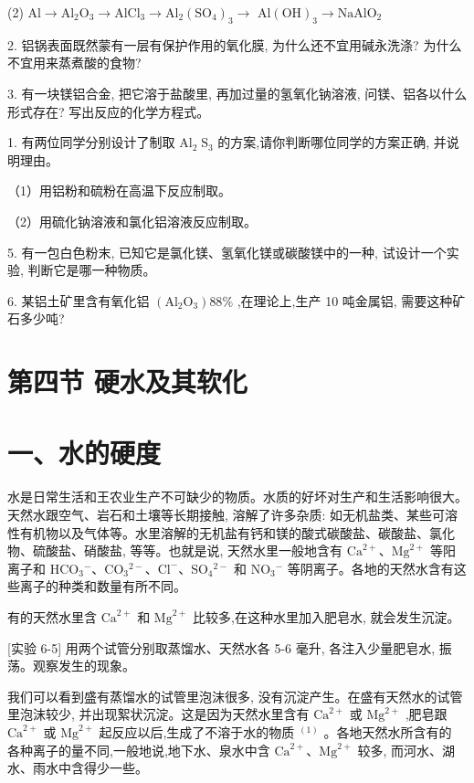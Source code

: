\documentclass[10pt]{article}
\begin{document}
(2) \(\mathrm{{Al}} \rightarrow {\mathrm{{Al}}}_{2}{\mathrm{O}}_{3} \rightarrow {\mathrm{{AlCl}}}_{3} \rightarrow {\mathrm{{Al}}}_{2}{\left( {\mathrm{{SO}}}_{4}\right) }_{3} \rightarrow\) \(\mathrm{{Al}}{\left( \mathrm{{OH}}\right) }_{3} \rightarrow {\mathrm{{NaAlO}}}_{2}\)

2. 铝锅表面既然蒙有一层有保护作用的氧化膜, 为什么还不宜用碱永洗涤? 为什么不宜用来蒸煮酸的食物?

3. 有一块镁铝合金, 把它溶于盐酸里, 再加过量的氢氧化钠溶液, 问镁、铝各以什么形式存在? 写出反应的化学方程式。

1. 有两位同学分别设计了制取 \({\mathrm{{Al}}}_{2}{\mathrm{\;S}}_{3}\) 的方案,请你判断哪位同学的方案正确, 并说明理由。

（1）用铝粉和硫粉在高温下反应制取。

（2）用硫化钠溶液和氯化铝溶液反应制取。

5. 有一包白色粉末, 已知它是氯化镁、氢氧化镁或碳酸镁中的一种, 试设计一个实验, 判断它是哪一种物质。

6. 某铝土矿里含有氧化铝 \(\left( {{\mathrm{{Al}}}_{2}{\mathrm{O}}_{3}}\right) {88}\%\) ,在理论上,生产 10 吨金属铝, 需要这种矿石多少吨?

\section*{第四节 硬水及其软化}

\section*{一、水的硬度}

水是日常生活和王农业生产不可缺少的物质。水质的好坏对生产和生活影响很大。天然水跟空气、岩石和土壤等长期接触, 溶解了许多杂质: 如无机盐类、某些可溶性有机物以及气体等。水里溶解的无机盐有钙和镁的酸式碳酸盐、碳酸盐、氯化物、硫酸盐、硝酸盐, 等等。也就是说, 天然水里一般地含有 \({\mathrm{{Ca}}}^{2 + }\text{、}{\mathrm{{Mg}}}^{2 + }\) 等阳离子和 \({\mathrm{{HCO}}}_{3}{}^{ - }\text{、}{\mathrm{{CO}}}_{3}{}^{2 - }\text{、}{\mathrm{{Cl}}}^{ - }\text{、}{\mathrm{{SO}}}_{4}{}^{2 - }\) 和 \({\mathrm{{NO}}}_{3}{}^{ - }\) 等阴离子。各地的天然水含有这些离子的种类和数量有所不同。

有的天然水里含 \({\mathrm{{Ca}}}^{2 + }\) 和 \({\mathrm{{Mg}}}^{2 + }\) 比较多,在这种水里加入肥皂水, 就会发生沉淀。

[实验 6-5] 用两个试管分别取蒸馏水、天然水各 5-6 毫升, 各注入少量肥皂水, 振荡。观察发生的现象。

我们可以看到盛有蒸馏水的试管里泡沫很多, 没有沉淀产生。在盛有天然水的试管里泡沫较少, 并出现絮状沉淀。这是因为天然水里含有 \({\mathrm{{Ca}}}^{2 + }\) 或 \({\mathrm{{Mg}}}^{2 + }\) ,肥皂跟 \({\mathrm{{Ca}}}^{2 + }\) 或 \({\mathrm{{Mg}}}^{2 + }\) 起反应以后,生成了不溶于水的物质 \({}^{\left( 1\right) }\) 。各地天然水所含有的 各种离子的量不同,一般地说,地下水、泉水中含 \({\mathrm{{Ca}}}^{2 + }\text{、}{\mathrm{{Mg}}}^{2 + }\) 较多, 而河水、湖水、雨水中含得少一些。
\end{document}
